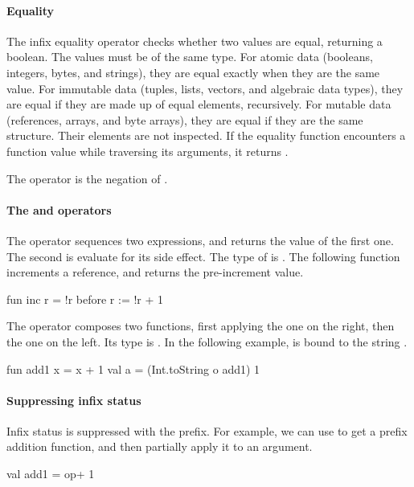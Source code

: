 \documentclass[12pt,a4paper]{book}
\begin{document}
\paragraph{Equality}

The infix equality operator \smlinline{=} checks whether two values are equal, returning a boolean. The values must be of the same type. For atomic data (booleans, integers, bytes, and strings), they are equal exactly when they are the same value. For immutable data (tuples, lists, vectors, and algebraic data types), they are equal if they are made up of equal elements, recursively. For mutable data (references, arrays, and byte arrays), they are equal if they are the same structure. Their elements are not inspected.
If the equality function encounters a function value while traversing its arguments, it returns .

The \smlinline{<>} operator is the negation of \smlinline{=}.

\paragraph{The  and  operators}

The  operator sequences two expressions, and returns the
value of the first one. The second is evaluate for its side effect. The type of
 is . The following function
increments a reference, and returns the pre-increment value.
\begin{smlcode}
fun inc r =
  !r before r := !r + 1
\end{smlcode}

The  operator composes two functions, first applying the one on
the right, then the one on the left. Its type is . In the following example,  is bound to the
string .
\begin{smlcode}
fun add1 x = x + 1
val a = (Int.toString o add1) 1
\end{smlcode}


\paragraph{Suppressing infix status}
Infix status is suppressed with the  prefix.
For example, we can use  to get a prefix
addition function, and then partially apply it to an argument.
\begin{smlcode}
val add1 = op+ 1
\end{smlcode}
\end{document}
